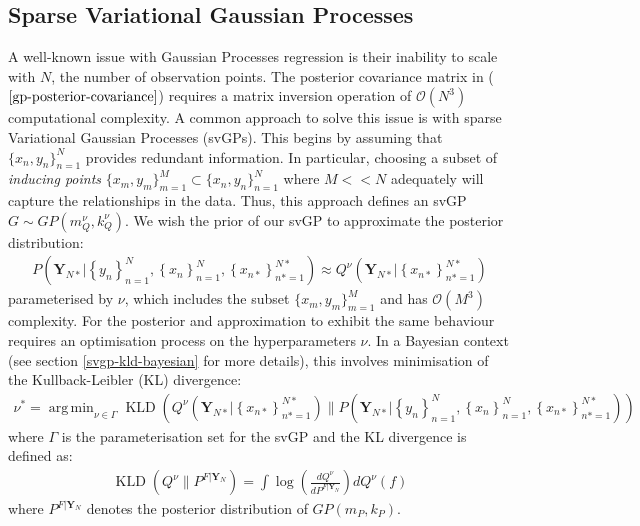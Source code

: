 \documentclass[twoside,11pt]{article}
\newcommand{\KLD}{\operatorname{KLD}}
\DeclareMathOperator*{\argmin}{arg\,min}
\begin{document}
\subsection{Sparse Variational Gaussian Processes \cite{wild2023connections}}
A well-known issue with Gaussian Processes regression is their inability to scale with $N$, the number of observation points. The posterior covariance matrix in ($\ref{gp-posterior-covariance}$) requires a matrix inversion operation of $\mathcal{O}(N^3)$ computational complexity. A common approach to solve this issue is with sparse Variational Gaussian Processes (svGPs). This begins by assuming that $\{x_n, y_n\}_{n=1}^{N}$ provides redundant information. In particular, choosing a subset of \textit{inducing points} $\{x_m, y_m\}_{m=1}^{M} \subset \{x_n, y_n\}_{n=1}^{N}$ where $M << N$ adequately will capture the relationships in the data. Thus, this approach defines an svGP $G \sim GP(m_Q^\nu, k_Q^\nu)$. We wish the prior of our svGP to approximate the posterior distribution: \begin{align}
    P\left(\mathbf{Y}_{N*} \Big\vert \left\{ y_n\right\}_{n=1}^N,  \left\{ x_n\right\}_{n=1}^N,  \left\{ x_{n*}\right\}_{n*=1}^{N*}\right) \approx Q^\nu\left(\mathbf{Y}_{N*} \Big\vert \left\{ x_{n*}\right\}_{n*=1}^{N*}\right)
\end{align}
 parameterised by $\nu$, which includes the subset $\{x_m, y_m\}_{m=1}^{M}$ and has $\mathcal{O}(M^3)$ complexity. For the posterior and approximation to exhibit the same behaviour requires an optimisation process on the hyperparameters $\nu$. In a Bayesian context (see section \ref{svgp-kld-bayesian} for more details), this involves minimisation of the Kullback-Leibler (KL) divergence:
\begin{align}
    \nu^* = \argmin_{\nu \in \Gamma} \KLD\left(Q^\nu\left(\mathbf{Y}_{N*} \Big\vert \left\{ x_{n*}\right\}_{n*=1}^{N*}\right) \Big\| P\left(\mathbf{Y}_{N*} \Big\vert \left\{ y_n\right\}_{n=1}^N,  \left\{ x_n\right\}_{n=1}^N,  \left\{ x_{n*}\right\}_{n*=1}^{N*}\right) \right)
    \label{svgp-minimiser}
\end{align}
where $\Gamma$ is the parameterisation set for the svGP and the KL divergence is defined as:
\begin{align}
    \KLD\left(Q^{\nu} \Big\| P^{F \vert \mathbf{Y}_N} \right) = \int \log \left( \frac{dQ^{\nu}}{d P^{F \vert \mathbf{Y}_N}} \right) d Q^{\nu}(f)
    \label{svgp-kld-loss}
\end{align}
where $P^{F \vert \mathbf{Y}_N}$ denotes the posterior distribution of $GP(m_P, k_P)$. 
\end{document}
